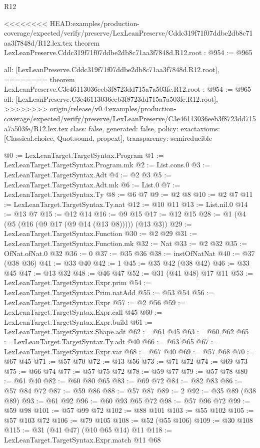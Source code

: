 \begin{lexlean}{R12}
\begin{coremodule}
{{{{{{{{}
<<<<<<<< HEAD:examples/production-coverage/expected/verify/preserve/LexLeanPreserve/Cddc319f71f07ddbe2db8c71aa3f7848d/R12.lex.tex
theorem LexLeanPreserve.Cddc319f71f07ddbe2db8c71aa3f7848d.R12.root : @954 := @965 {
  all: [LexLeanPreserve.Cddc319f71f07ddbe2db8c71aa3f7848d.R12.root],
========
theorem LexLeanPreserve.C3e46113036eeb3f8723dd715a7a503fe.R12.root : @954 := @965 {
  all: [LexLeanPreserve.C3e46113036eeb3f8723dd715a7a503fe.R12.root],
>>>>>>>> origin/release/v0.4:examples/production-coverage/expected/verify/preserve/LexLeanPreserve/C3e46113036eeb3f8723dd715a7a503fe/R12.lex.tex
  class: false,
  generated: false,
  policy: exact{axioms: [Classical.choice, Quot.sound, propext]},
  transparency: semireducible
}

@0 := LexLeanTarget.TargetSyntax.Program
@1 := LexLeanTarget.TargetSyntax.Program.mk
@2 := List.cons.{0}
@3 := LexLeanTarget.TargetSyntax.Adt
@4 := @2 @3
@5 := LexLeanTarget.TargetSyntax.Adt.mk
@6 := List.{0}
@7 := LexLeanTarget.TargetSyntax.Ty
@8 := @6 @7
@9 := @2 @8
@10 := @2 @7
@11 := LexLeanTarget.TargetSyntax.Ty.nat
@12 := @10 @11
@13 := List.nil.{0}
@14 := @13 @7
@15 := @12 @14
@16 := @9 @15
@17 := @12 @15
@28 := @1 (@4 (@5 (@16 (@9 @17 (@9 @14 (@13 @8))))) (@13 @3))
@29 := LexLeanTarget.TargetSyntax.Function
@30 := @2 @29
@31 := LexLeanTarget.TargetSyntax.Function.mk
@32 := Nat
@33 := @2 @32
@35 := OfNat.ofNat.{0} @32
@36 := 0
@37 := @35 @36
@38 := instOfNatNat
@40 := @37 (@38 @36)
@41 := @33 @40
@42 := 1
@45 := @35 @42 (@38 @42)
@46 := @33 @45
@47 := @13 @32
@48 := @46 @47
@52 := @31 (@41 @48) @17 @11
@53 := LexLeanTarget.TargetSyntax.Expr.prim
@54 := LexLeanTarget.TargetSyntax.Prim.natAdd
@55 := @53 @54
@56 := LexLeanTarget.TargetSyntax.Expr
@57 := @2 @56
@59 := LexLeanTarget.TargetSyntax.Expr.call @45
@60 := LexLeanTarget.TargetSyntax.Expr.build
@61 := LexLeanTarget.TargetSyntax.Shape.adt
@62 := @61 @45
@63 := @60 @62
@65 := LexLeanTarget.TargetSyntax.Ty.adt @40
@66 := @63 @65
@67 := LexLeanTarget.TargetSyntax.Expr.var
@68 := @67 @40
@69 := @57 @68
@70 := @67 @45
@71 := @57 @70
@72 := @13 @56
@73 := @71 @72
@74 := @69 @73
@75 := @66 @74
@77 := @57 @75 @72
@78 := @59 @77
@79 := @57 @78
@80 := @61 @40
@82 := @60 @80 @65
@83 := @69 @72
@84 := @82 @83
@86 := @57 @84 @72
@87 := @59 @86
@88 := @57 @87
@89 := 2
@92 := @35 @89 (@38 @89)
@93 := @61 @92
@96 := @60 @93 @65 @72
@98 := @57 @96 @72
@99 := @59 @98
@101 := @57 @99 @72
@102 := @88 @101
@103 := @55 @102
@105 := @57 @103 @72
@106 := @79 @105
@108 := @52 (@55 @106)
@109 := @30 @108
@115 := @31 (@41 @47) (@10 @65 @14) @11
@118 := LexLeanTarget.TargetSyntax.Expr.match @11 @68
}}}}}}}}
\end{coremodule}
\end{lexlean}
